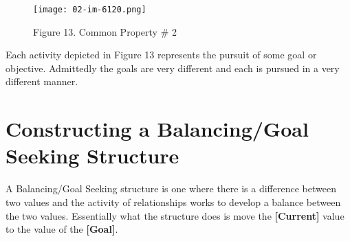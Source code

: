 \documentclass[]{memoir}
\makeatletter
\def\maxwidth{\ifdim\Gin@nat@width>\linewidth\linewidth
\else\Gin@nat@width\fi}
\let\Oldincludegraphics\includegraphics
\renewcommand{\includegraphics}[1]{\Oldincludegraphics[width=\maxwidth]{#1}}
\newcommand{\p}[1]{\textbf{{[}#1{]}}}
\makeatother
\begin{document}
\begin{figure}[htbp]
\centering
\texttt{[image: 02-im-6120.png]}
\caption{Figure 13. Common Property \# 2}
\end{figure}

Each activity depicted in Figure 13 represents the pursuit of some goal
or objective. Admittedly the goals are very different and each is
pursued in a very different manner.

\section{Constructing a Balancing/Goal Seeking Structure}

A Balancing/Goal Seeking structure is one where there is a difference
between two values and the activity of relationships works to develop a
balance between the two values. Essentially what the structure does is
move the \p{Current} value to the value of the \p{Goal}.

\FloatBarrier 
\end{document}
